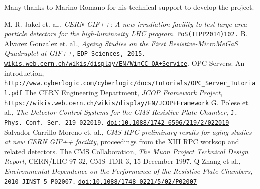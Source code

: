 \documentclass[a4paper,11pt]{article}
\begin{document}
\acknowledgments
Many thanks to Marino Romano for his technical support to develop the project.   


\begin{thebibliography}{99}
 M. R. Jakel et. al., \emph{CERN GIF++: A new irradiation facility to test large-area particle detectors for the high-luminosity LHC program.}
\texttt{PoS(TIPP2014)102.} 
 B. Alvarez Gonzalez et. al., \emph{Ageing Studies on the First Resistive-MicroMeGaS Quadruplet at GIF++, }\texttt{EDP Sciences, 2015.}
 \href{https://wikis.web.cern.ch/wikis/display/EN/WinCC-OA+Service}{\texttt{wikis.web.cern.ch/wikis/display/EN/WinCC-OA+Service}}.
OPC Servers: An introduction,
\href{http://www.cyberlogic.com/cyberlogic/docs/tutorials/OPC\_Server\_Tutorial.pdf}{\texttt{http://www.cyberlogic.com/cyberlogic/docs/tutorials/OPC\_Server\_Tutorial.pdf}}
The CERN Engineering Department, \emph{JCOP Framework Project},
\href{https://wikis.web.cern.ch/wikis/display/EN/JCOP+Framework}{\texttt{https://wikis.web.cern.ch/wikis/display/EN/JCOP+Framework}}
G. Polese et. al., \emph{The Detector Control Systems for the CMS Resistive Plate Chamber, }\texttt{J. Phys. Conf. Ser. 219 022019.}
\href{http://iopscience.iop.org/article/10.1088/1742-6596/219/2/022019/pdf}{\texttt{doi:10.1088/1742-6596/219/2/022019}}
Salvador Carrillo Moreno et. al., \emph{CMS RPC preliminary results for aging studies at new CERN GIF++ facility}, proceedings from the XIII RPC worksop and related detectors.
The CMS Collaboration, \emph{The Muon Project Technical Design Report}, CERN/LHC 97-32, CMS TDR 3, 15 December 1997.
Q Zhang et al., \emph{Environmental Dependence on the Performance of the Resistive Plate Chambers, }\texttt{2010 JINST 5 P02007.}
\href{http://iopscience.iop.org/article/10.1088/1748-0221/5/02/P02007/pdf}{\texttt{doi:10.1088/1748-0221/5/02/P02007}}

\end{thebibliography}
\end{document}
